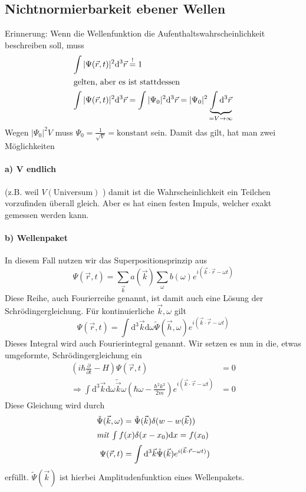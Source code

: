 \documentclass[oneside]{book}
\theoremstyle{definition}
\renewcommand{\d}{\mathrm d}
\newcommand{\fpartial}[1]{\frac{\partial}{\partial #1}}
\newcommand{\const}{\text{konstant}}
\begin{document}
\subsection{Nichtnormierbarkeit ebener Wellen}
Erinnerung: Wenn die Wellenfunktion die Aufenthaltswahrscheinlichkeit beschreiben soll, muss
\begin{align*}
\int |\Psi(\vec{r}, t)|^2 \d^3 \vec{r} &\overset!= 1\\
\intertext{gelten, aber es ist stattdessen}
\int |\Psi(\vec{r}, t)|^2 \d^3 \vec{r} &= \int |\Psi_0|^2 \d^3 \vec{r} = |\Psi_0|^2 \underbrace{\int \d^3 \vec{r}}_{=V \to \infty}
\end{align*}
Wegen $|\Psi_0|^2 V$ muss $\Psi_0 = \frac{1}{\sqrt V} = \const$ sein. Damit das gilt, hat man zwei Möglichkeiten
\paragraph{a) V endlich} (z.B. weil $V(\text{Universum})$ ) damit ist die Wahrscheinlichkeit ein Teilchen vorzufinden überall gleich. Aber es hat einen festen Impuls, welcher exakt gemessen werden kann.
\paragraph{b) \textbf{Wellenpaket}}
In diesem Fall nutzen wir das Superpositionsprinzip aus
$$\Psi(\vec{r}, t) = \sum_{\vec{k}} a (\vec{k}) \sum_{\omega} b(\omega) e^{i(\vec{k}\cdot \vec{r} - \omega t)}$$
Diese Reihe, auch Fourierreihe genannt, ist damit auch eine Lösung der Schrödingergleichung. Für kontinuierliche $\vec{k}, \omega$ gilt
$$\Psi(\vec{r}, t) = \int \d^3 \vec{k} \d \omega \tilde\Psi (\vec{h}, \omega) e^{i(\vec{k}\cdot \vec{r} - \omega t)}$$ Dieses Integral wird auch Fourierintegral genannt. Wir setzen es nun in die, etwas umgeformte, Schrödingergleichung ein
\begin{align*}
	(i \hbar \fpartial{t} - H) \Psi(\vec{r}, t) &= 0\\
	\Rightarrow \int \d^3 \vec{k} \d \omega \tilde{\vec{k}}\omega (\hbar \omega - \frac{\hbar^2 k^2}{2m}) e^{i(\vec{k}\cdot \vec{r} - \omega t)} &= 0
\end{align*}
Diese Gleichung wird durch
\begin{align*}
\tilde\Psi(\vec{k}, \omega) &= \tilde\Psi (\vec{k}) \delta(w -w(\vec k))\\
\intertext{\textit{mit} $\int f(x) \delta(x - x_0) \d x = f (x_0)$}
\Psi(\vec{r}, t) &= \int \d^3 \vec{k} \tilde{\Psi} (\vec{k}) e^{i(\vec{k}\cdot \vec{r} - \omega t)})
\end{align*}
erfüllt.
$\tilde \Psi(\vec{k})$ ist hierbei Amplitudenfunktion eines Wellenpakets.
\end{document}
